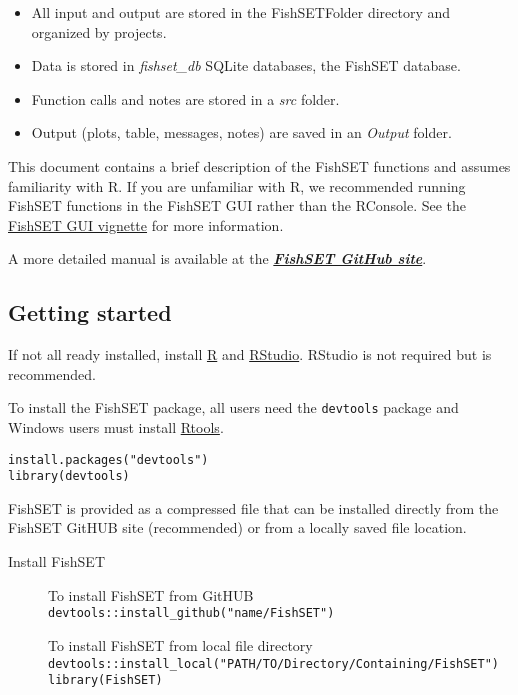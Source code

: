 \documentclass[
]{article}
\providecommand{\tightlist}{%
  \setlength{\itemsep}{0pt}\setlength{\parskip}{0pt}}
\begin{document}
\begin{itemize}
\tightlist
\item
  All input and output are stored in the FishSETFolder directory and organized by projects.
\item
  Data is stored in \emph{fishset\_db} SQLite databases, the FishSET database.
\item
  Function calls and notes are stored in a \emph{src} folder.
\item
  Output (plots, table, messages, notes) are saved in an \emph{Output} folder.
\end{itemize}

This document contains a brief description of the FishSET functions and assumes familiarity with R.
If you are unfamiliar with R, we recommended running FishSET functions in the FishSET GUI rather than the RConsole. See the \href{FishSET_GUI.html}{FishSET GUI vignette} for more information.

A more detailed manual is available at the \textbf{\emph{\href{WEBSITE\%20URL}{FishSET GitHub site}}}.

\hypertarget{getting-started}{%
\subsection{Getting started}\label{getting-started}}

If not all ready installed, install \href{https://cloud.r-project.org/}{R} and \href{https://www.rstudio.com/products/rstudio/download/\#download}{RStudio}.
RStudio is not required but is recommended.

To install the FishSET package, all users need the \texttt{devtools} package and Windows users must install \href{https://cran.r-project.org/bin/windows/Rtools/}{Rtools}.

\begin{description}
\tightlist
\item[Install devtools (required)]
\texttt{install.packages("devtools")}\\
\texttt{library(devtools)}
\end{description}

FishSET is provided as a compressed file that can be installed directly from the FishSET GitHUB site (recommended) or
from a locally saved file location.

\begin{description}
\item[Install FishSET]
To install FishSET from GitHUB\\
\texttt{devtools::install\_github("name/FishSET")}

To install FishSET from local file directory
\texttt{devtools::install\_local("PATH/TO/Directory/Containing/FishSET")}\\
\texttt{library(FishSET)}
\end{description}
\end{document}
